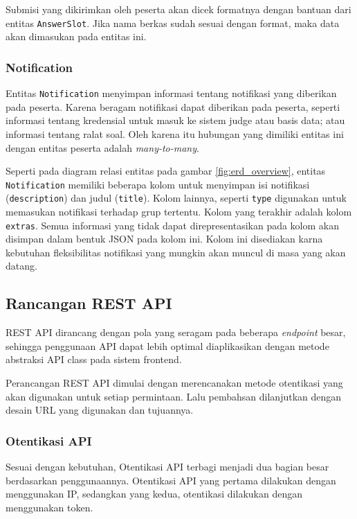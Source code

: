     Submisi yang dikirimkan oleh peserta akan dicek formatnya dengan bantuan
    dari entitas \texttt{AnswerSlot}. Jika nama berkas sudah sesuai dengan
    format, maka data akan dimasukan pada entitas ini.
    
\subsubsection{Notification}
    Entitas \texttt{Notification} menyimpan informasi tentang notifikasi yang
    diberikan pada peserta. Karena beragam notifikasi dapat diberikan pada
    peserta, seperti informasi tentang kredensial untuk masuk ke sistem judge
    atau basis data; atau informasi tentang ralat soal. Oleh karena itu hubungan
    yang dimiliki entitas ini dengan entitas peserta adalah
    \textit{many-to-many}.
    
    Seperti pada diagram relasi entitas pada gambar \ref{fig:erd_overview},
    entitas \texttt{Notification} memiliki beberapa kolom untuk menyimpan isi
    notifikasi (\texttt{description}) dan judul (\texttt{title}). Kolom lainnya,
    seperti \texttt{type} digunakan untuk memasukan notifikasi terhadap grup
    tertentu. Kolom yang terakhir adalah kolom \texttt{extras}. Semua informasi
    yang tidak dapat direpresentasikan pada kolom akan disimpan dalam bentuk
    JSON pada kolom ini. Kolom ini disediakan karna kebutuhan fleksibilitas
    notifikasi yang mungkin akan muncul di masa yang akan datang.

\subsection{Rancangan REST API}
    REST API dirancang dengan pola yang seragam pada beberapa \textit{endpoint}
    besar, sehingga penggunaan API dapat lebih optimal diaplikasikan dengan
    metode abstraksi API class pada sistem frontend.
    
    Perancangan REST API dimulai dengan merencanakan metode otentikasi yang akan
    digunakan untuk setiap permintaan. Lalu pembahsan dilanjutkan dengan desain
    URL yang digunakan dan tujuannya.
    
\subsubsection{Otentikasi API}
    Sesuai dengan kebutuhan, Otentikasi API terbagi menjadi dua bagian besar
    berdasarkan penggunaannya. Otentikasi API yang pertama dilakukan dengan
    menggunakan IP, sedangkan yang kedua, otentikasi dilakukan dengan
    menggunakan token.
    
